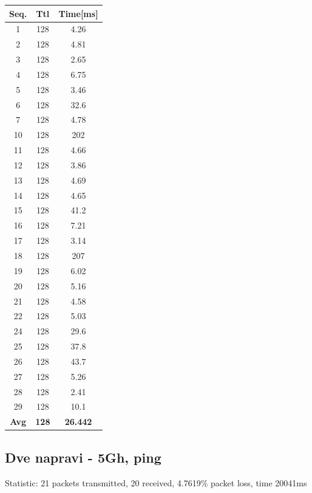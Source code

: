 \documentclass[11pt,a4paper,slovene]{article}
\begin{document}
\begin{table}[H]
	\begin{adjustwidth}{-3cm}{-3cm}
	\centering
		\begin{tabular}{c|c|c}
		\hline
		\textbf{Seq.} & \textbf{Ttl} & \textbf{Time[ms]}\\
     		\hline
     		1 & 128 & 4.26\\
  		2 & 128 & 4.81\\
  		3 & 128 & 2.65\\
  		4 & 128 & 6.75\\
  		5 & 128 & 3.46\\
  		6 & 128 & 32.6\\
  		7 & 128 & 4.78\\
  		10 & 128 & 202\\
  		11 & 128 & 4.66\\
  		12 & 128 & 3.86\\
  		13 & 128 & 4.69\\
  		14 & 128 & 4.65\\
  		15 & 128 & 41.2\\
  		16 & 128 & 7.21\\
  		17 & 128 & 3.14\\
  		18 & 128 & 207\\
  		19 & 128 & 6.02\\
  		20 & 128 & 5.16\\
  		21 & 128 & 4.58\\
  		22 & 128 & 5.03\\
  		24 & 128 & 29.6\\
  		25 & 128 & 37.8\\
  		26 & 128 & 43.7\\
  		27 & 128 & 5.26\\
  		28 & 128 & 2.41\\
  		29 & 128 & 10.1\\
  		\hline
  		\textbf{Avg} & \textbf{128} & \textbf{26.442}\\
  		\hline
  		\end{tabular}
    	\end{adjustwidth}
\end{table}

\subsection{Dve napravi - 5Gh, ping}

Statistic: 21 packets transmitted, 20 received, 4.7619\% packet loss, time 20041ms
 
\end{document}
